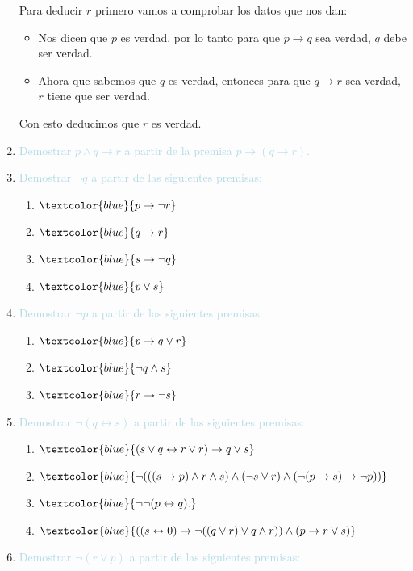 \documentclass{article}
\newcommand{\lb}[1]{\textcolor{lightblue}{#1}}
\newcommand{\db}[1]{\textcolor{blue}{#1}}
\begin{document}
\begin{enumerate}[label=\color{red}\textbf{\arabic*)}, leftmargin=*]
      Para deducir $r$ primero vamos a comprobar los datos que nos dan: 
      \begin{itemize}[label=$-$]
      \item Nos dicen que $p$ es verdad, por lo tanto para que $p\longrightarrow q$ sea verdad, $q$ debe ser verdad.
      \item Ahora que sabemos que $q$ es verdad, entonces para que $q\longrightarrow r$ sea verdad, $r$ tiene que ser verdad.
      \end{itemize}
      Con esto deducimos que $r$ es verdad.
      \item \lb{Demostrar $p\wedge q\to r$ a partir de la premisa $p\to(q\to r)$.}
      \item \lb{Demostrar $\neg q$ a partir de las siguientes premisas:}
      \begin{enumerate}[label=\color{red}\alph*)]
            \item $\db{p\to\neg r}$
            \item $\db{q\to r}$
            \item $\db{s\to\neg q}$
            \item $\db{p\vee s}$
      \end{enumerate}
      \item \lb{Demostrar $\neg p$ a partir de las siguientes premisas:}
      \begin{enumerate}[label=\color{red}\alph*)]
            \item $\db{p\to q\vee r}$
            \item $\db{\neg q\wedge s}$
            \item $\db{r\to\neg s}$
      \end{enumerate}
      \item \lb{Demostrar $\neg(q\leftrightarrow s)$ a partir de las siguientes premisas:}
      \begin{enumerate}[label=\color{red}\alph*)]
            \item $\db{(s\vee q\leftrightarrow r\vee r)\to q\vee s}$
            \item $\db{\neg(((s\to p)\wedge r\wedge s)\wedge(\neg s\vee r)\wedge(\neg(p\to s)\to\neg p))}$
            \item $\db{\neg\neg(p\leftrightarrow q).}$
            \item $\db{((s\leftrightarrow 0)\to\neg((q\vee r)\vee q\wedge r))\wedge(p\to r\vee s)}$
      \end{enumerate}
      \item \lb{Demostrar $\neg(r\vee p)$ a partir de las siguientes premisas:}

\end{enumerate}
\end{document}
